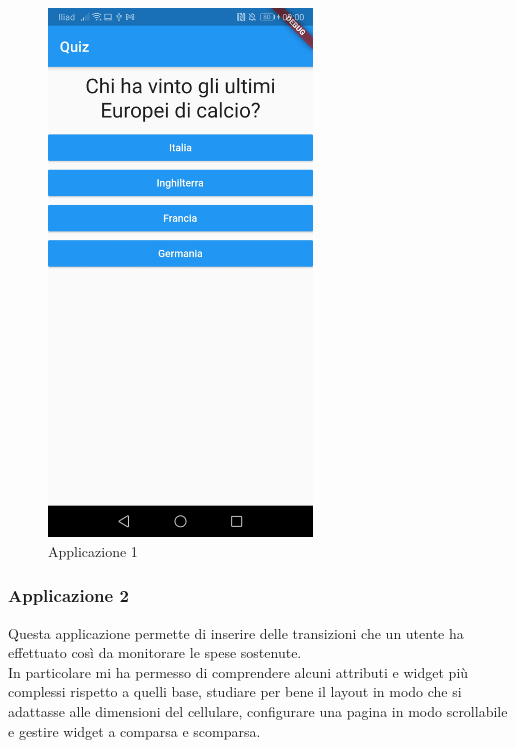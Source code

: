 \begin{figure}[htbp]	
	\centering
	\includegraphics[width=7cm]{immagini/app1.jpeg}
	\caption{Applicazione 1}
	\label{fig:Applicazione 1}
\end{figure}

\newpage

\subsubsection{Applicazione 2}
Questa applicazione permette di inserire delle transizioni che un utente ha effettuato così da monitorare le spese sostenute.\\
In particolare mi ha permesso di comprendere alcuni attributi e widget più complessi rispetto a quelli base, studiare per bene il layout in modo che si adattasse alle dimensioni del cellulare, configurare una pagina in modo scrollabile e gestire widget a comparsa e scomparsa.\\


